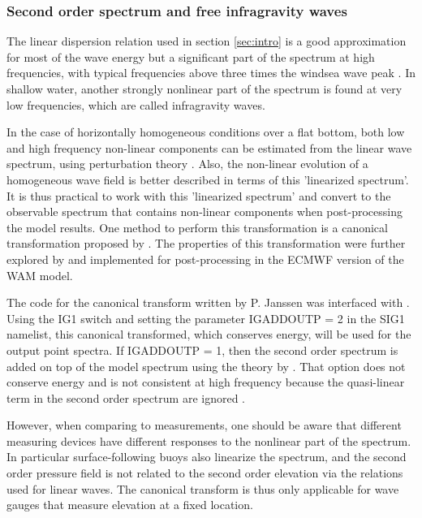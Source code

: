\vsssub
\subsubsection{Second order spectrum and free infragravity waves} \label{sec:IG1}
\vsssub


\noindent 
The linear dispersion relation used in section \ref{sec:intro} is a good
approximation for most of the wave energy but a significant part of the
spectrum at high frequencies, with typical frequencies above three times the
windsea wave peak \citep[e.g.][]{rep:Lec13}.  In shallow water, another
strongly nonlinear part of the spectrum is found at very low frequencies,
which are called infragravity waves.

In the case of horizontally homogeneous conditions over a flat bottom, both
low and high frequency non-linear components can be estimated from the linear
wave spectrum, using perturbation theory \citep[e.g.][]{art:Has62}. Also, the
non-linear evolution of a homogeneous wave field is better described in terms
of this 'linearized spectrum'. It is thus practical to work with this
'linearized spectrum' and convert to the observable spectrum that contains
non-linear components when post-processing the model results. One method to
perform this transformation is a canonical transformation proposed by
\cite{art:Kra94}. The properties of this transformation were further explored
by \cite{art:Jan09} and implemented for post-processing in the ECMWF version
of the WAM model.

The code for the canonical transform written by P. Janssen was interfaced with
\ws.  Using the {\code IG1} switch and setting the parameter {\code IGADDOUTP
= 2} in the {\code SIG1} namelist, this canonical transformed, which conserves
energy, will be used for the output point spectra.  If {\code IGADDOUTP = 1},
then the second order spectrum is added on top of the model spectrum using the
theory by \citep[e.g.][]{art:Has62}. That option does not conserve energy and
is not consistent at high frequency because the quasi-linear term in the
second order spectrum are ignored \citep{art:Jan09}.

However, when comparing to measurements, one should be aware that different
measuring devices have different responses to the nonlinear part of the
spectrum. In particular surface-following buoys also linearize the spectrum,
and the second order pressure field is not related to the second order
elevation via the relations used for linear waves. The canonical transform is
thus only applicable for wave gauges that measure elevation at a fixed
location.

